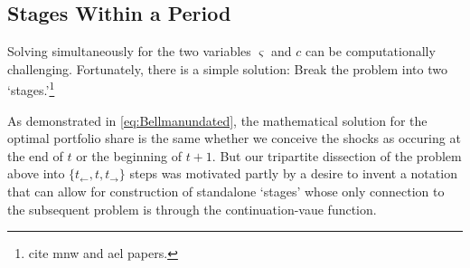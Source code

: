 \documentclass[titlepage, headings=optiontotocandhead]{Resources/texmf-local/tex/latex/econtex}
\begin{document}
\hypertarget{stages-within-a-period}{}
\subsection{Stages Within a Period}\label{subsec:stageswithin}


Solving simultaneously for the two variables $\varsigma$ and ${c}$ can be computationally challenging.  Fortunately, there is a simple solution: Break the problem into two `stages.'\footnote{cite mnw and ael papers.}

As demonstrated in \eqref{eq:Bellmanundated}, the mathematical solution for the optimal portfolio share is the same whether we conceive the shocks as occuring at the end of $t$ or the beginning of $t+1.$  But our tripartite dissection of the problem above into $\{t_{\leftarrow},t,t_{\rightarrow}\}$ steps was motivated partly by a desire to invent a notation that can allow for construction of standalone `stages' whose only connection to the subsequent problem is through the continuation-vaue function.
\end{document}

